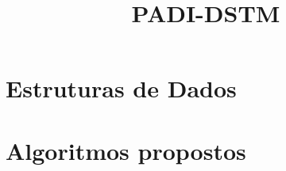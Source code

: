 \documentclass[times, 10pt,twocolumn]{article}
\begin{document}
\title{PADI-DSTM}

\maketitle
\thispagestyle{empty}








\section{Estruturas de Dados}











\section{Algoritmos propostos}




%







\nocite{ex1,ex2}


\end{document}
